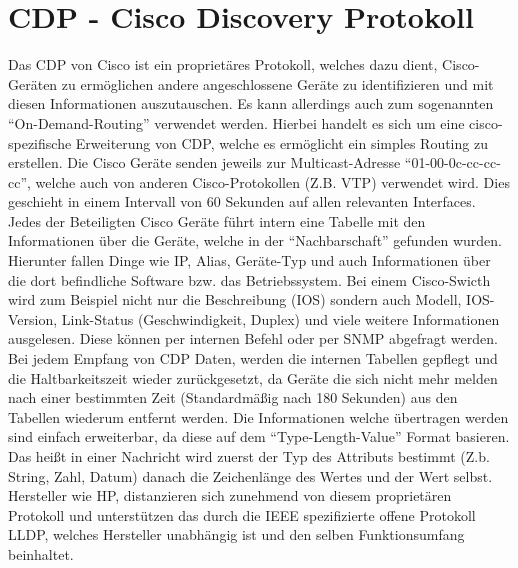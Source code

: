 \section{CDP - Cisco Discovery Protokoll}
\label{sec:cdp}

Das CDP von Cisco ist ein proprietäres Protokoll, welches dazu dient, Cisco-Geräten zu ermöglichen andere angeschlossene Geräte zu identifizieren und mit diesen Informationen auszutauschen. Es kann allerdings auch zum sogenannten “On-Demand-Routing” verwendet werden. Hierbei handelt es sich um eine cisco-spezifische Erweiterung von CDP, welche es ermöglicht ein simples Routing zu erstellen.
Die Cisco Geräte senden jeweils zur Multicast-Adresse “01-00-0c-cc-cc-cc”, welche auch von anderen Cisco-Protokollen (Z.B. VTP) verwendet wird. Dies geschieht in einem Intervall von 60 Sekunden auf allen relevanten Interfaces. Jedes der Beteiligten Cisco Geräte führt intern eine Tabelle mit den Informationen über die Geräte, welche in der “Nachbarschaft” gefunden wurden. Hierunter fallen Dinge wie IP, Alias, Geräte-Typ und auch Informationen über die dort befindliche Software bzw. das Betriebssystem.
Bei einem Cisco-Swicth wird zum Beispiel nicht nur die Beschreibung (IOS) sondern auch Modell, IOS-Version, Link-Status (Geschwindigkeit, Duplex) und viele weitere Informationen ausgelesen.
Diese können per internen Befehl oder per SNMP abgefragt werden. Bei jedem Empfang von CDP Daten, werden die internen Tabellen gepflegt und die Haltbarkeitszeit wieder zurückgesetzt, da Geräte die sich nicht mehr melden nach einer bestimmten Zeit (Standardmäßig nach 180 Sekunden) aus den Tabellen wiederum entfernt werden. Die Informationen welche übertragen werden sind einfach erweiterbar, da diese auf dem “Type-Length-Value” Format basieren. Das heißt in einer Nachricht wird zuerst der Typ des Attributs bestimmt (Z.b. String, Zahl, Datum) danach die Zeichenlänge des Wertes und der Wert selbst.\\
Hersteller wie HP, distanzieren sich zunehmend von diesem proprietären Protokoll und unterstützen das durch die IEEE spezifizierte offene Protokoll LLDP, welches Hersteller unabhängig ist und den selben Funktionsumfang beinhaltet.
